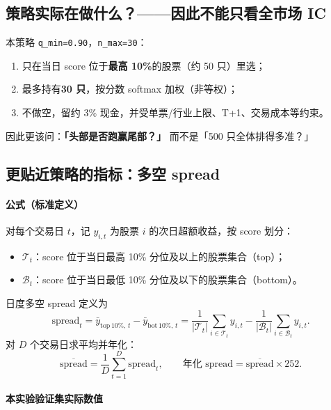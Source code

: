 \documentclass[UTF8,a4paper,12pt]{ctexart}
\begin{document}
\subsection{策略实际在做什么？——因此不能只看全市场 IC}

本策略 \texttt{q\_min=0.90}，\texttt{n\_max=30}：
\begin{enumerate}[leftmargin=2em]
  \item 只在当日 score 位于\textbf{最高 10\%}的股票（约 50 只）里选；
  \item 最多持有\textbf{30 只}，按分数 softmax 加权（非等权）；
  \item 不做空，留约 3\% 现金，并受单票/行业上限、T+1、交易成本等约束。
\end{enumerate}

因此更该问：\textbf{「头部是否跑赢尾部？」} 而不是「500 只全体排得多准？」

\subsection{更贴近策略的指标：多空 spread}

\paragraph{公式（标准定义）}

对每个交易日 $t$，记 $y_{i,t}$ 为股票 $i$ 的次日超额收益，按 score 划分：
\begin{itemize}[leftmargin=2em]
  \item $\mathcal{T}_t$：score 位于当日最高 10\% 分位及以上的股票集合（top）；
  \item $\mathcal{B}_t$：score 位于当日最低 10\% 分位及以下的股票集合（bottom）。
\end{itemize}
日度多空 spread 定义为
\begin{equation}
  \mathrm{spread}_t
  = \bar{y}_{\mathrm{top\,10\%},\,t} - \bar{y}_{\mathrm{bot\,10\%},\,t}
  = \frac{1}{|\mathcal{T}_t|}\sum_{i\in\mathcal{T}_t} y_{i,t}
   - \frac{1}{|\mathcal{B}_t|}\sum_{i\in\mathcal{B}_t} y_{i,t}.
  \label{eq:spread-daily}
\end{equation}
对 $D$ 个交易日求平均并年化：
\begin{equation}
  \overline{\mathrm{spread}} = \frac{1}{D}\sum_{t=1}^{D}\mathrm{spread}_t,
  \qquad
  \text{年化 spread} = \overline{\mathrm{spread}} \times 252.
  \label{eq:spread-ann}
\end{equation}

\paragraph{本实验验证集实际数值}
\end{document}
